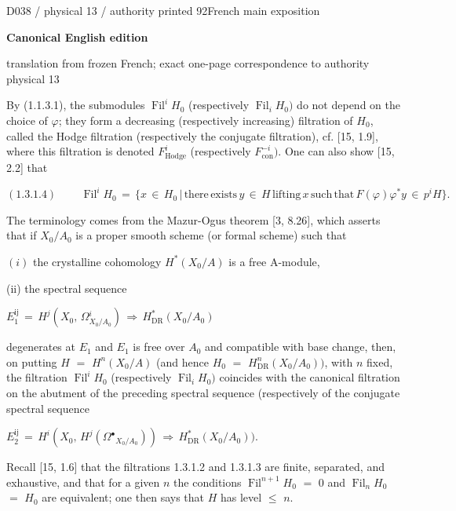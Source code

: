 \documentclass[9pt]{article}
\newcommand{\CanonText}[1]{\par{\fontsize{8.0}{9.35}\selectfont\RaggedRight #1\par}\vspace{2.2pt}}
\newcommand{\CanonDisplay}[1]{\par\vspace{1.2pt}\begin{center}{\fontsize{7.2}{8.4}\selectfont\(\displaystyle #1\)}\end{center}\vspace{1.2pt}}
\newcommand{\LayerTitle}{Canonical English edition}
\begin{document}
\noindent\begin{minipage}[t][\dimexpr\textheight-5pt\relax][t]{\textwidth}
{\sffamily\fontsize{7.3}{8.2}\selectfont\color{Quiet} D038 / physical 13 / authority printed 92\hfill French main exposition}
\par{}\vspace{4.5pt}
{\sffamily\fontsize{10.4}{11.6}\selectfont\bfseries\color{Accent} \LayerTitle}
\par{\sffamily\fontsize{6.7}{7.7}\selectfont\color{Quiet} translation from frozen French; exact one-page correspondence to authority physical 13}
\vspace{5pt}
\CanonText{By (1.1.3.1), the submodules \(\operatorname{Fil}^{i}H_{0}\) (respectively \(\operatorname{Fil}_{i}H_{0})\) do not depend on the choice of \(\varphi{}\); they form a decreasing (respectively increasing) filtration of \(H_{0}\), called the Hodge filtration (respectively the conjugate filtration), cf. [15, 1.9], where this filtration is denoted \(F^{i}_{\mathrm{Hodge}}\) (respectively \(F^{-i}_{\mathrm{con}})\). One can also show [15, 2.2] that}
\CanonDisplay{(1.3.1.4)\qquad\,\operatorname{Fil}^{i}H_{0}\,=\,\lbrace{}x\,\in{}\,H_{0}\,|\,\text{there}\,\text{exists}\,y\,\in{}\,H\,\text{lifting}\,x\,\text{such}\,\text{that}\,F(\varphi{})\varphi{}^{*}y\,\in{}\,p^{i}H\rbrace{}.}
\CanonText{The terminology comes from the Mazur-Ogus theorem [3, 8.26], which asserts that if \(X_{0}/A_{0}\) is a proper smooth scheme (or formal scheme) such that}
\CanonText{\((i)\) the crystalline cohomology \(H^{*}(X_{0}/A)\) is a free A-module,}
\CanonText{(ii) the spectral sequence}
\CanonDisplay{E_{1}^{\mathrm{ij}}\,=\,H^{j}(X_{0},\,\Omega{}^{i}_{X_{0}/A_{0}})\,\Rightarrow{}\,H^{*}_{\mathrm{DR}}(X_{0}/A_{0})}
\CanonText{degenerates at \(E_{1}\) and \(E_{1}\) is free over \(A_{0}\) and compatible with base change, then, on putting \(H\) \(=\) \(H^{n}(X_{0}/A)\) (and hence \(H_{0}\) \(=\) \(H^{n}_{\mathrm{DR}}(X_{0}/A_{0}))\), with \(n\) fixed, the filtration \(\operatorname{Fil}^{i}H_{0}\) (respectively \(\operatorname{Fil}_{i}H_{0})\) coincides with the canonical filtration on the abutment of the preceding spectral sequence (respectively of the conjugate spectral sequence}
\CanonDisplay{E_{2}^{\mathrm{ij}}\,=\,H^{i}(X_{0},\,H^{j}(\Omega{}^\bullet{}_{X_{0}/A_{0}}))\,\Rightarrow{}\,H^{*}_{\mathrm{DR}}(X_{0}/A_{0})).}
\CanonText{Recall [15, 1.6] that the filtrations 1.3.1.2 and 1.3.1.3 are finite, separated, and exhaustive, and that for a given \(n\) the conditions \(\operatorname{Fil}^{n+1}H_{0}\) \(=\) 0 and \(\operatorname{Fil}_{n}H_{0}\) \(=\) \(H_{0}\) are equivalent; one then says that \(H\) has level \(\leq{}\) \(n\).}

\end{minipage}
\end{document}
